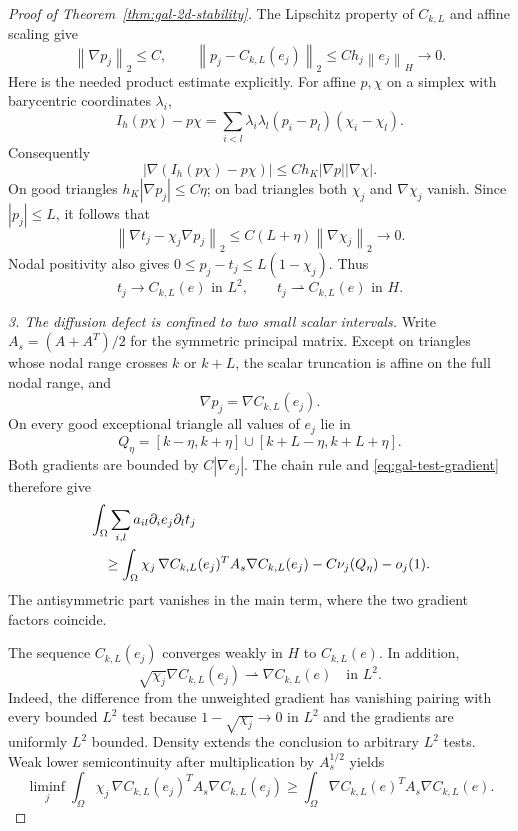 \documentclass[11pt,a4paper]{article}
\newcommand{\norm}[1]{\left\lVert#1\right\rVert}
\newcommand{\abs}[1]{\left\lvert#1\right\rvert}
\theoremstyle{definition}
\theoremstyle{remark}
\numberwithin{equation}{section}
\begin{document}
\begin{proof}[Proof of Theorem~\ref{thm:gal-2d-stability}]
The Lipschitz property of $C_{k,L}$ and affine scaling give
\begin{equation}\label{eq:gal-p-estimates}
 \norm{\nabla p_j}_2\le C,
 \qquad
 \norm{p_j-C_{k,L}(e_j)}_2\le Ch_j\norm{e_j}_H\longrightarrow0.
\end{equation}
Here is the needed product estimate explicitly. For affine $p,\chi$ on a simplex with barycentric coordinates $\lambda_i$,
\[
 I_h(p\chi)-p\chi
  =\sum_{i<l}\lambda_i\lambda_l(p_i-p_l)(\chi_i-\chi_l).
\]
Consequently
\begin{equation}\label{eq:gal-product-estimate}
 \abs{\nabla(I_h(p\chi)-p\chi)}
   \le Ch_K\abs{\nabla p}\abs{\nabla\chi}.
\end{equation}
On good triangles $h_K\abs{\nabla p_j}\le C\eta$; on bad triangles both $\chi_j$ and $\nabla\chi_j$ vanish. Since $\abs{p_j}\le L$, it follows that
\begin{equation}\label{eq:gal-test-gradient}
 \norm{\nabla t_j-\chi_j\nabla p_j}_2
 \le C(L+\eta)\norm{\nabla\chi_j}_2\longrightarrow0.
\end{equation}
Nodal positivity also gives $0\le p_j-t_j\le L(1-\chi_j)$. Thus
\begin{equation}\label{eq:gal-test-limit}
 t_j\longrightarrow C_{k,L}(e)\text{ in }L^2,
 \qquad t_j\rightharpoonup C_{k,L}(e)\text{ in }H.
\end{equation}

\emph{3. The diffusion defect is confined to two small scalar intervals.}
Write $A_s=(A+A^T)/2$ for the symmetric principal matrix. Except on triangles whose nodal range crosses $k$ or $k+L$, the scalar truncation is affine on the full nodal range, and
\[
 \nabla p_j=\nabla C_{k,L}(e_j).
\]
On every good exceptional triangle all values of $e_j$ lie in
\[
 Q_\eta=[k-\eta,k+\eta]\cup[k+L-\eta,k+L+\eta].
\]
Both gradients are bounded by $C\abs{\nabla e_j}$. The chain rule and \eqref{eq:gal-test-gradient} therefore give
\begin{align}
 &\int_\Omega\sum_{i,l}a_{il}\partial_i e_j\partial_l t_j\notag\\
 &\quad\ge
 \int_\Omega\chi_j\,
   \nabla C_{k,L}(e_j)^T A_s\nabla C_{k,L}(e_j)
       -C\nu_j(Q_\eta)-o_j(1).
 \label{eq:gal-diffusion-lower}
\end{align}
The antisymmetric part vanishes in the main term, where the two gradient factors coincide.

The sequence $C_{k,L}(e_j)$ converges weakly in $H$ to $C_{k,L}(e)$. In addition,
\[
 \sqrt{\chi_j}\nabla C_{k,L}(e_j)
       \rightharpoonup\nabla C_{k,L}(e)\quad\text{in }L^2.
\]
Indeed, the difference from the unweighted gradient has vanishing pairing with every bounded $L^2$ test because $1-\sqrt{\chi_j}\to0$ in $L^2$ and the gradients are uniformly $L^2$ bounded. Density extends the conclusion to arbitrary $L^2$ tests. Weak lower semicontinuity after multiplication by $A_s^{1/2}$ yields
\begin{equation}\label{eq:gal-weighted-lsc}
 \liminf_j\int_\Omega\chi_j\,
   \nabla C_{k,L}(e_j)^T A_s\nabla C_{k,L}(e_j)
 \ge\int_\Omega\nabla C_{k,L}(e)^T A_s\nabla C_{k,L}(e).
\end{equation}


\end{proof}
\end{document}
